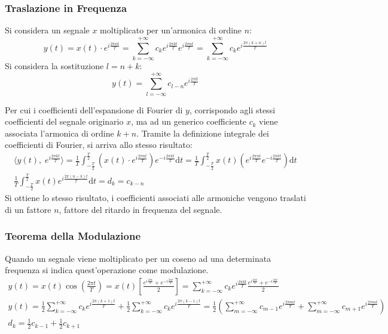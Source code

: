 \documentclass{article}
\newcommand{\df}{\mathrm{d}}
\numberwithin{equation}{subsection}
\begin{document}
\subsubsection{Traslazione in Frequenza}

Si considera un segnale $x$ moltiplicato per un'armonica di ordine $n$:
\begin{equation*}
    y(t)=x(t)\cdot e^{i\frac{2\pi nt}{T}}=\displaystyle\sum_{k=-\infty}^{+\infty}c_ke^{i\frac{2\pi kt}{T}}e^{i\frac{2\pi nt}{T}}=\sum_{k=-\infty}^{+\infty}c_ke^{i\frac{2\pi (k+n)t}{T}}
\end{equation*}
Si considera la sostituzione $l=n+k$:
\begin{equation*}
    y(t)=\displaystyle\sum_{l=-\infty}^{+\infty}c_{l-n}e^{i\frac{2\pi lt}{T}}
\end{equation*}

Per cui i coefficienti dell'espansione di Fourier di $y$, corrispondo agli stessi coefficienti del segnale originario $x$, ma ad un generico coefficiente $c_k$ viene 
associata l'armonica di ordine $k+n$.   
Tramite la definizione integrale dei coefficienti di Fourier, si arriva allo stesso risultato:
\begin{gather*}
    \langle y(t),\;e^{i\frac{2\pi kt}{T}}\rangle=\displaystyle\frac{1}{T}\int_{-\frac{T}{2}}^{\frac{T}{2}}\left(x(t)\cdot e^{i\frac{2\pi nt}{T}}\right)e^{-i\frac{2\pi kt}{T}}\df t=\frac{1}{T}\int_{-\frac{T}{2}}^{\frac{T}{2}}x(t)\left(e^{i\frac{2\pi nt}{T}}e^{-i\frac{2\pi kt}{T}}\right)\df t\\
    \displaystyle\frac{1}{T}\int_{-\frac{T}{2}}^{\frac{T}{2}}x(t)e^{i\frac{2\pi (n-k)t}{T}}\df t=d_k=c_{k-n}
\end{gather*}
Si ottiene lo stesso risultato, i coefficienti associati alle armoniche vengono traslati di un fattore $n$, fattore del ritardo in frequenza del segnale.  

\subsubsection{Teorema della Modulazione}

Quando un segnale viene moltiplicato per un coseno ad una determinata frequenza si indica quest'operazione come modulazione. 
\begin{gather*}
    y(t)=x(t)\cos\displaystyle\left(\frac{2\pi t}{T}\right)=x(t)\left[\frac{e^{i\frac{2\pi t}{T}}+e^{-i\frac{2\pi t}{T}}}{2}\right]=\sum_{k=-\infty}^{+\infty}c_ke^{i\frac{2\pi kt}{T}}\frac{e^{i\frac{2\pi t}{T}}+e^{-i\frac{2\pi t}{T}}}{2}\\
    y(t)=\displaystyle\frac{1}{2}\sum_{k=-\infty}^{+\infty}c_ke^{i\frac{2\pi (k+1)t}{T}}+\frac{1}{2}\sum_{k=-\infty}^{+\infty}c_ke^{i\frac{2\pi (k-1)t}{T}}=\frac{1}{2}\left(\sum_{m=-\infty}^{+\infty}c_{m-1}e^{i\frac{2\pi mt}{T}}+\sum_{m=-\infty}^{+\infty}c_{m+1}e^{i\frac{2\pi mt}{T}}\right)\\
    d_k=\displaystyle\frac{1}{2}c_{k-1}+\frac{1}{2}c_{k+1}
\end{gather*}
\end{document}
